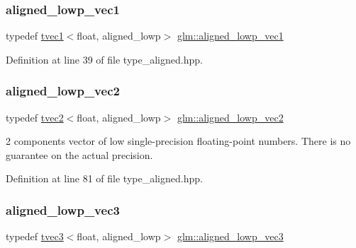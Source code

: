 \mbox{\label{group__gtc__type__aligned_ga9f8de0030682199a8dbef56b0f3fb3ca}} 
\subsubsection{\texorpdfstring{aligned\_lowp\_vec1}{aligned\_lowp\_vec1}}
{\footnotesize\ttfamily typedef \mbox{\hyperlink{structglm_1_1tvec1}{tvec1}}$<$float, aligned\+\_\+lowp$>$ \mbox{\hyperlink{group__gtc__type__aligned_ga9f8de0030682199a8dbef56b0f3fb3ca}{glm\+::aligned\+\_\+lowp\+\_\+vec1}}}



Definition at line 39 of file type\+\_\+aligned.\+hpp.

\mbox{\label{group__gtc__type__aligned_gab09a9786d58f065dafde28b725cc5370}} 
\subsubsection{\texorpdfstring{aligned\_lowp\_vec2}{aligned\_lowp\_vec2}}
{\footnotesize\ttfamily typedef \mbox{\hyperlink{structglm_1_1tvec2}{tvec2}}$<$float, aligned\+\_\+lowp$>$ \mbox{\hyperlink{group__gtc__type__aligned_gab09a9786d58f065dafde28b725cc5370}{glm\+::aligned\+\_\+lowp\+\_\+vec2}}}

2 components vector of low single-\/precision floating-\/point numbers. There is no guarantee on the actual precision. 

Definition at line 81 of file type\+\_\+aligned.\+hpp.

\mbox{\label{group__gtc__type__aligned_ga19ab3efcfafe1def4240723f7056ca79}} 
\subsubsection{\texorpdfstring{aligned\_lowp\_vec3}{aligned\_lowp\_vec3}}
{\footnotesize\ttfamily typedef \mbox{\hyperlink{structglm_1_1tvec3}{tvec3}}$<$float, aligned\+\_\+lowp$>$ \mbox{\hyperlink{group__gtc__type__aligned_ga19ab3efcfafe1def4240723f7056ca79}{glm\+::aligned\+\_\+lowp\+\_\+vec3}}}

